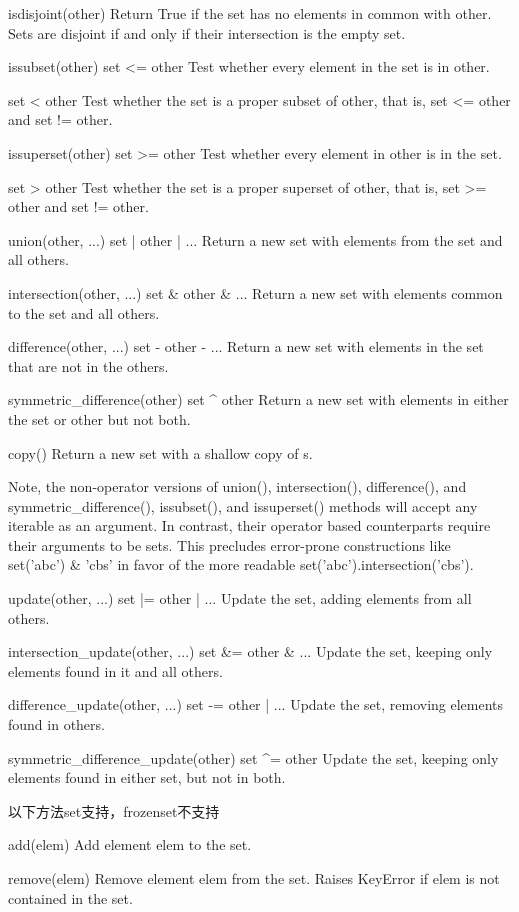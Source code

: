 \documentclass[5pt,a4paper,twocolumn]{article}
\begin{document}
isdisjoint(other)
Return True if the set has no elements in common with other. Sets are disjoint if and only if their intersection is the empty set.

issubset(other)
set <= other
Test whether every element in the set is in other.

set < other
Test whether the set is a proper subset of other, that is, set <= other and set != other.

issuperset(other)
set >= other
Test whether every element in other is in the set.

set > other
Test whether the set is a proper superset of other, that is, set >= other and set != other.

union(other, ...)
set | other | ...
Return a new set with elements from the set and all others.

intersection(other, ...)
set \& other \& ...
Return a new set with elements common to the set and all others.

difference(other, ...)
set - other - ...
Return a new set with elements in the set that are not in the others.

symmetric\_difference(other)
set \^{} other
Return a new set with elements in either the set or other but not both.

copy()
Return a new set with a shallow copy of s.

Note, the non-operator versions of union(), intersection(), difference(), and symmetric\_difference(), issubset(), and issuperset() methods will accept any iterable as an argument. In contrast, their operator based counterparts require their arguments to be sets. This precludes error-prone constructions like set('abc') \& 'cbs' in favor of the more readable set('abc').intersection('cbs').

update(other, ...)
set |= other | ...
Update the set, adding elements from all others.

intersection\_update(other, ...)
set \&= other \& ...
Update the set, keeping only elements found in it and all others.

difference\_update(other, ...)
set -= other | ...
Update the set, removing elements found in others.

symmetric\_difference\_update(other)
set \^{}= other
Update the set, keeping only elements found in either set, but not in both.

以下方法set支持，frozenset不支持

add(elem)
Add element elem to the set.

remove(elem)
Remove element elem from the set. Raises KeyError if elem is not contained in the set.
\end{document}
